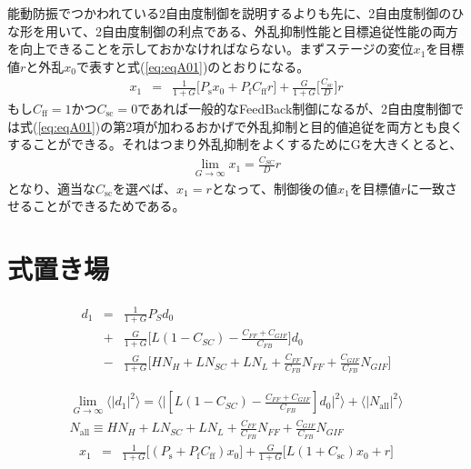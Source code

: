 \documentclass[a4paper,12pt]{jsarticle}
\begin{document}
能動防振でつかわれている2自由度制御を説明するよりも先に、2自由度制御のひな形を用いて、2自由度制御の利点である、外乱抑制性能と目標追従性能の両方を向上できることを示しておかなければならない。まずステージの変位$x_1$を目標値$r$と外乱$x_0$で表すと式(\ref{eq:eqA01})のとおりになる。
\begin{eqnarray} \label{eq:eqA01}
  x_1 &=& \frac{1}{1+G}\Biggl[P_{\mathrm{s}}x_0 + P_{\mathrm{f}}C_{\mathrm{ff}}r\Biggl] + \frac{G}{1+G}\Biggl[\frac{C_{\mathrm{sc}}}{D}\Biggl]r
\end{eqnarray}
もし$C_{\mathrm{ff}}=1$かつ$C_{\mathrm{sc}}=0$であれば一般的なFeedBack制御になるが、2自由度制御では式(\ref{eq:eqA01})の第2項が加わるおかげで外乱抑制と目的値追従を両方とも良くすることができる。それはつまり外乱抑制をよくするためにGを大きくとると、
\begin{eqnarray} \label{eq:eqA02}
  \lim_{G \to \infty} x_1 = \frac{C_{SC}}{D}r
\end{eqnarray}
となり、適当な$C_{\mathrm{sc}}$を選べば、$x_{1}=r$となって、制御後の値$x_{1}$を目標値$r$に一致させることができるためである。

\section{式置き場}

\begin{eqnarray}
  d_1 &=& \frac{1}{1+G}P_{S}d_0 \\
  &+& \frac{G}{1+G}\Biggl[L(1-C_{SC})-\frac{C_{FF}+C_{GIF}}{C_{FB}}\Biggl]d_0 \nonumber \\
  &-& \frac{G}{1+G}\Biggl[HN_{H} + LN_{SC} + LN_{L} + \frac{C_{FF}}{C_{FB}}N_{FF} + \frac{C_{GIF}}{C_{FB}}N_{GIF} \Biggl] \nonumber
\end{eqnarray}

\begin{eqnarray}
  \lim_{G \to \infty} \langle|d_1|^2\rangle =
  \biggl\langle\biggl|[L(1-C_{SC})-\frac{C_{FF}+C_{GIF}}{C_{FB}}]d_0\biggl|^2\biggl\rangle + \langle|N_{\mathrm{all}}|^2 \rangle \\
N_{\mathrm{all}} \equiv HN_{H} + LN_{SC} + LN_{L} + \frac{C_{FF}}{C_{FB}}N_{FF} + \frac{C_{GIF}}{C_{FB}}N_{GIF} \nonumber
\end{eqnarray}
%
%
\begin{eqnarray}
  x_1 &=& \frac{1}{1+G}\Biggl[(P_{\mathrm{s}}+P_{\mathrm{f}}C_{\mathrm{ff}})x_0\Biggl]
  + \frac{G}{1+G}\Biggl[L(1+C_{\mathrm{sc}})x_0 + r\Biggl]
\end{eqnarray}



\end{document}

